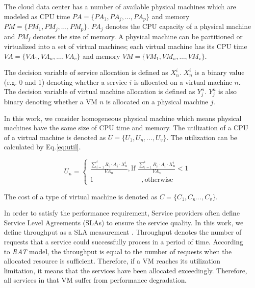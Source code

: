 The cloud data center has a number of available physical machines which are modeled as
CPU time $PA = \{PA_1, PA_j, \dots, PA_p\}$ and memory
$PM = \{PM_1, PM_j, \dots, PM_p\}$. $PA_j$ denotes the CPU capacity of a physical machine 
and $PM_j$ denotes the size of memory. A physical machine can be partitioned or
 virtualized into a set of virtual machines; 
 each virtual machine has its 
 CPU time $VA = \{VA_1, VA_n, \dots, VA_v\}$ and 
 memory $VM = \{VM_1, VM_n, \dots, VM_v\}$. 


The decision variable of service allocation is defined as $X^i_n$. $X^i_n$
is a binary value (e.g. 0 and 1) denoting whether a
service $i$ is allocated on a virtual machine $n$.
The decision variable of virtual machine allocation is defined as $Y^n_j$. $Y^n_j$
is also binary denoting whether a
VM $n$ is allocated on a physical machine $j$.


 In this work, we consider homogeneous physical machine which means physical machines have the same size of CPU time and memory. 
 The utilization of a CPU of a virtual machine is denoted as $U = \{U_1, U_n, \dots, U_v\}$. 
 The utilization can be calculated by Eq.\ref{eq:util}.

\begin{equation}
\label{eq:util}
  U_n =
  \begin{cases} 
    \frac{\sum_{i = 1}^t R_i \cdot A_i \cdot X^i_n}{VA_n}, \text{If }  \frac{\sum_{i = 1}^t R_i \cdot A_i \cdot X^i_n}{VA_n} < 1 \\
    1   \quad\quad\quad\quad\quad\quad\quad ,\text{otherwise}
  \end{cases}
\end{equation}

The cost of a type of virtual machine is denoted as $C = \{C_1, C_n \dots, C_v\}$. 



In order to satisfy the performance requirement, Service providers often define Service Level Agreements (SLAs) to ensure the service quality. In this work, we define throughput as a SLA measurement \cite{SLA_metric}. 
Throughput denotes the number of requests that a service could successfully process in a period of time. According to \textit{RAT} model, the throughput is equal to the number of requests when the allocated resource is sufficient. 
Therefore, if a VM reaches its utilization limitation, it means that the services have been allocated exceedingly.
Therefore, all services in that VM suffer from 
performance degradation.


